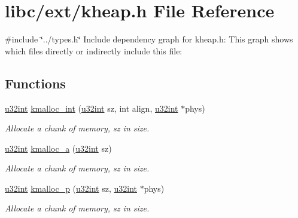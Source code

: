 \hypertarget{a00074}{}\section{libc/ext/kheap.h File Reference}
\label{a00074}
{\ttfamily \#include \char`\"{}../types.\+h\char`\"{}}\newline
Include dependency graph for kheap.\+h\+:
This graph shows which files directly or indirectly include this file\+:
\subsection*{Functions}
\begin{DoxyCompactItemize}
\item 
\hyperlink{a00125_a7ae3a26c17ddfe117c6291739780801d_a7ae3a26c17ddfe117c6291739780801d}{u32int} \hyperlink{a00074_a8b976e8a7e805ef85fcfa68b9b9bbd63_a8b976e8a7e805ef85fcfa68b9b9bbd63}{kmalloc\+\_\+int} (\hyperlink{a00125_a7ae3a26c17ddfe117c6291739780801d_a7ae3a26c17ddfe117c6291739780801d}{u32int} sz, int align, \hyperlink{a00125_a7ae3a26c17ddfe117c6291739780801d_a7ae3a26c17ddfe117c6291739780801d}{u32int} $\ast$phys)
\begin{DoxyCompactList}\small\item\em Allocate a chunk of memory, sz in size. \end{DoxyCompactList}\item 
\hyperlink{a00125_a7ae3a26c17ddfe117c6291739780801d_a7ae3a26c17ddfe117c6291739780801d}{u32int} \hyperlink{a00074_a2f7fc26d2604f7bd8bd6d4fac5c98f16_a2f7fc26d2604f7bd8bd6d4fac5c98f16}{kmalloc\+\_\+a} (\hyperlink{a00125_a7ae3a26c17ddfe117c6291739780801d_a7ae3a26c17ddfe117c6291739780801d}{u32int} sz)
\begin{DoxyCompactList}\small\item\em Allocate a chunk of memory, sz in size. \end{DoxyCompactList}\item 
\hyperlink{a00125_a7ae3a26c17ddfe117c6291739780801d_a7ae3a26c17ddfe117c6291739780801d}{u32int} \hyperlink{a00074_ac688411503d5934c65d6c5c1ef204d81_ac688411503d5934c65d6c5c1ef204d81}{kmalloc\+\_\+p} (\hyperlink{a00125_a7ae3a26c17ddfe117c6291739780801d_a7ae3a26c17ddfe117c6291739780801d}{u32int} sz, \hyperlink{a00125_a7ae3a26c17ddfe117c6291739780801d_a7ae3a26c17ddfe117c6291739780801d}{u32int} $\ast$phys)
\begin{DoxyCompactList}\small\item\em Allocate a chunk of memory, sz in size. \end{DoxyCompactList}\item 

\end{DoxyCompactItemize}
